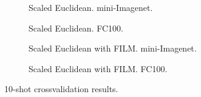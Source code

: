 \documentclass{article}
\begin{document}
\begin{figure}[t]
\centering
    \begin{subfigure}[t]{0.49\textwidth}
\caption{Scaled Euclidean. mini-Imagenet.}
        \label{fig:scaled_euclidean_miniimagenet_10shot}
    \end{subfigure}
    \begin{subfigure}[t]{0.49\textwidth}
\caption{Scaled Euclidean. FC100.}
        \label{fig:scaled_euclidean_cifar100_10shot}
    \end{subfigure}
    \begin{subfigure}[t]{0.49\textwidth}
\caption{Scaled Euclidean with FILM. mini-Imagenet.}
        \label{fig:scaled_euclidean_with_tbn_miniimagenet_10shot}
    \end{subfigure}
    \begin{subfigure}[t]{0.49\textwidth}
\caption{Scaled Euclidean with FILM. FC100.}
        \label{fig:scaled_euclidean_with_tbn_cifar100_10shot}
    \end{subfigure}
    \caption{10-shot  crossvalidation results.}
    \label{fig:metric_scaling_10shot}
\end{figure}
\fi
\end{document}
